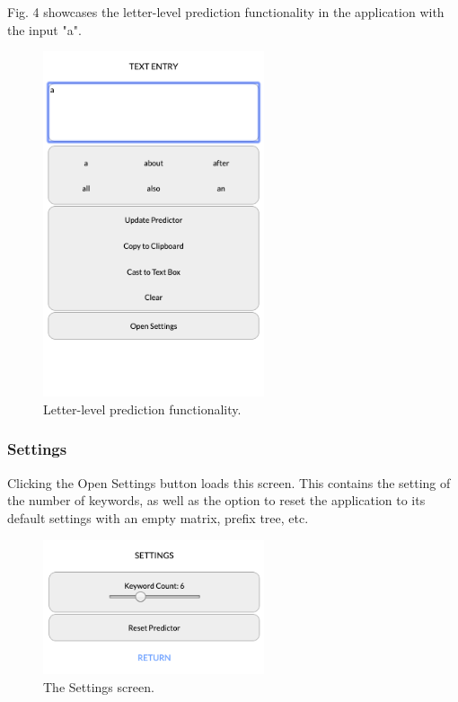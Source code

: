 \documentclass[journal]{./IEEE/IEEEtran}
\begin{document}
Fig. 4 showcases the letter-level prediction functionality in the application with the input "a". 

\begin{figure}[!ht]
\begin{center}

\includegraphics[width=65mm]{images/letter-level-prediction.png}
\caption{Letter-level prediction functionality.}

\end{center}
\end{figure}

\subsubsection{Settings}
Clicking the Open Settings button loads this screen. This contains the setting of the number of keywords, as well as the option to reset the application to its default settings with an empty matrix, prefix tree, etc.

\begin{figure}[!ht]
\begin{center}

\includegraphics[width=65mm]{images/settings.png}
\caption{The Settings screen.}

\end{center}
\end{figure}
\end{document}
